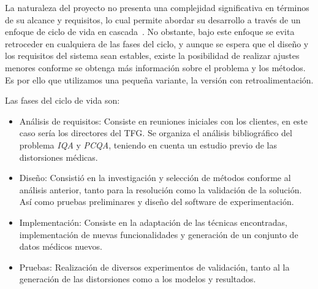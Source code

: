 La naturaleza del proyecto no presenta una complejidad significativa en términos 
de su alcance y requisitos, lo cual permite abordar su desarrollo a través de un 
enfoque de ciclo de vida en cascada~\cite{ModeloEnCascada}. 
No obstante, bajo este enfoque se evita retroceder en cualquiera de las fases 
del ciclo, y aunque se espera que el diseño y los requisitos del sistema sean 
estables, existe la posibilidad de realizar ajustes menores conforme se obtenga
más información sobre el problema y los métodos. 
Es por ello que utilizamos una pequeña variante, la versión con retroalimentación.
 
Las fases del ciclo de vida son: 
\begin{itemize}
  \item Análisis de requisitos: Consiste en reuniones iniciales con los clientes, 
    en este caso sería los directores del TFG. Se organiza el análisis bibliográfico 
    del problema \emph{IQA} y \emph{PCQA}\footnotemark[4], teniendo en cuenta un estudio previo 
    de las distorsiones médicas.
  \item Diseño: Consistió en la investigación y selección de métodos conforme 
    al análisis anterior, tanto para la resolución como la validación de la solución. 
    Así como pruebas preliminares y diseño del software de experimentación. 
  \item Implementación: Consiste en la adaptación de las técnicas encontradas, 
    implementación de nuevas funcionalidades y generación de un conjunto de datos 
    médicos nuevos.
  \item Pruebas: Realización de diversos experimentos de validación, tanto al 
    la generación de las distorsiones como a los modelos y resultados.
\end{itemize}
